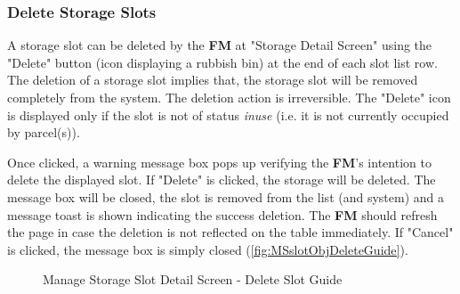 \subsubsection{Delete Storage Slots}
\label{subsubsec:deleteSlot}

A storage slot can be deleted by the \textbf{FM} at "Storage Detail Screen" using the "Delete" button (icon displaying a rubbish bin) at the end of each slot list row. 
The deletion of a storage slot implies that, the storage slot will be removed completely from the system. The deletion action is irreversible. 
The "Delete" icon is displayed only if the slot is not of status \textit{inuse} (i.e. it is not currently occupied by parcel(s)).

Once clicked, a warning message box pops up verifying the \textbf{FM}'s intention to delete the displayed slot. If "Delete" is clicked, the storage will be deleted. The message box will be closed, the slot is removed from the list (and system) and a message toast is shown indicating the success deletion. The \textbf{FM} should refresh the page in case the deletion is not reflected on the table immediately. If "Cancel" is clicked, the message box is simply closed (\autoref{fig:MSslotObjDeleteGuide}).

\begin{figure}[H]
	\centering
  
    \vspace{1pt}
    
    \caption{Manage Storage Slot Detail Screen - Delete Slot Guide}
	\label{fig:MSslotObjDeleteGuide}
\end{figure}


